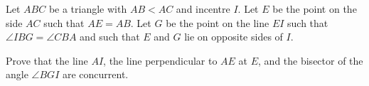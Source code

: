 Let $ABC$ be a triangle with $AB < AC$ and incentre $I$. Let $E$ be the point on the side $AC$ such that $AE = AB$. Let $G$ be the point on the line $EI$ such that $\angle IBG = \angle CBA$ and such that $E$ and $G$ lie on opposite sides of $I$.

Prove that the line $AI$,  the line perpendicular to $AE$ at $E$,  and the bisector of the angle $\angle BGI$ are concurrent.